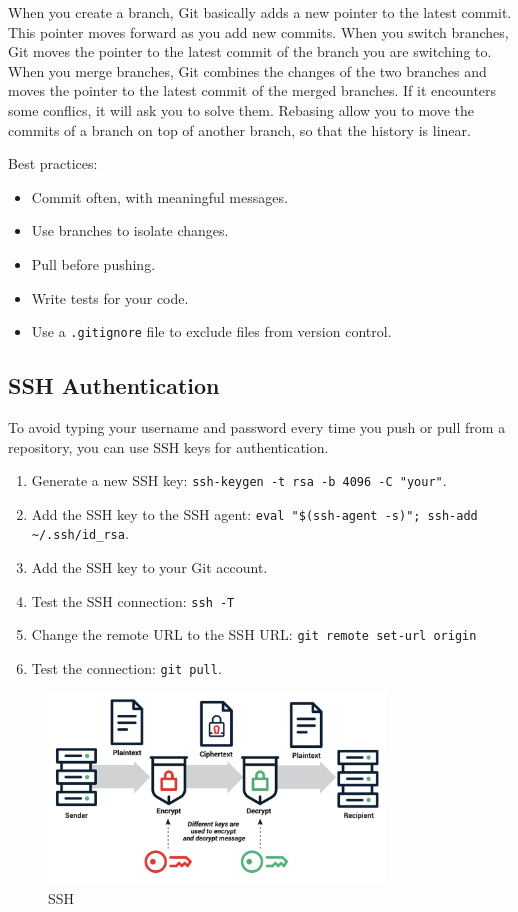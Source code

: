 When you create a branch, Git basically adds a new pointer to the latest commit. This pointer moves forward as you add new commits. 
When you switch branches, Git moves the pointer to the latest commit of the branch you are switching to.
When you merge branches, Git combines the changes of the two branches and moves the pointer to the latest commit of the merged branches. If it encounters some conflics, it will ask you to solve them.
Rebasing allow you to move the commits of a branch on top of another branch, so that the history is linear.

Best practices:
\begin{itemize}
    \item Commit often, with meaningful messages.
    \item Use branches to isolate changes.
    \item Pull before pushing.
    \item Write tests for your code.
    \item Use a \texttt{.gitignore} file to exclude files from version control.
\end{itemize}

\subsection{SSH Authentication}

To avoid typing your username and password every time you push or pull from a repository, you can use SSH keys for authentication.

\begin{tipsblock}
    \begin{enumerate}
        \item Generate a new SSH key: \texttt{ssh-keygen -t rsa -b 4096 -C "your\@email"}.
        \item Add the SSH key to the SSH agent: \texttt{eval "\$(ssh-agent -s)"; ssh-add \textasciitilde/.ssh/id\_rsa}.
        \item Add the SSH key to your Git account.
        \item Test the SSH connection: \texttt{ssh -T} \
        \item Change the remote URL to the SSH URL: \texttt{git remote set-url origin} \
        \item Test the connection: \texttt{git pull}.
    \end{enumerate}
\end{tipsblock}

\begin{figure}
    \centering
    \includegraphics[width=0.8\textwidth]{assets/ssh.png}
    \caption{SSH}
    \label{fig:ssh}
\end{figure}
